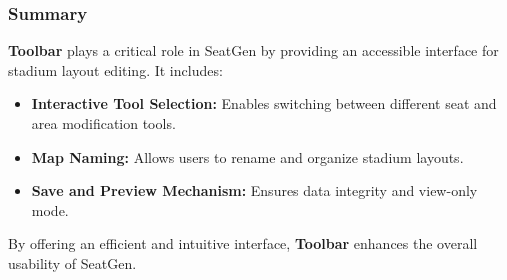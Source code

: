\subsubsection{Summary}
\textbf{Toolbar} plays a critical role in SeatGen by providing an accessible interface for stadium layout editing. It includes:
\begin{itemize}
    \item \textbf{Interactive Tool Selection:} Enables switching between different seat and area modification tools.
    \item \textbf{Map Naming:} Allows users to rename and organize stadium layouts.
    \item \textbf{Save and Preview Mechanism:} Ensures data integrity and view-only mode.
\end{itemize}

By offering an efficient and intuitive interface, \textbf{Toolbar} enhances the overall usability of SeatGen.
